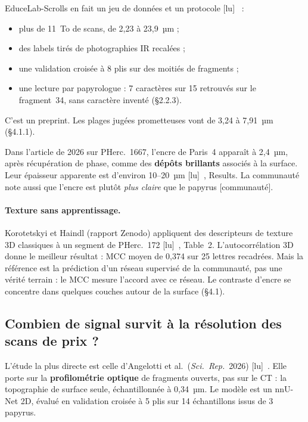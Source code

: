 \documentclass[11pt,a4paper]{article}
\newcommand{\lu}{\textsf{\small[lu]}}
\newcommand{\commu}{\textsf{\small[communauté]}}
\newcommand{\pherc}[1]{PHerc.~#1}
\begin{document}
EduceLab-Scrolls en fait un jeu de données et un protocole \lu~\cite{parsons2023} :
\begin{itemize}
  \item plus de 11~To de scans, de 2,23 à 23,9~µm ;
  \item des labels tirés de photographies IR recalées ;
  \item une validation croisée à 8 plis sur des moitiés de fragments ;
  \item une lecture par papyrologue : 7 caractères sur 15 retrouvés sur le fragment~34,
  sans caractère inventé (§2.2.3).
\end{itemize}
C'est un preprint. Les plages jugées prometteuses vont de 3,24 à 7,91~µm (§4.1.1).

Dans l'article de 2026 sur \pherc{1667}, l'encre de Paris~4 apparaît à 2,4~µm, après
récupération de phase, comme des \textbf{dépôts brillants} associés à la surface. Leur
épaisseur apparente est d'environ 10–20~µm \lu~\cite{angelotti2026complete}, Results.
La communauté note aussi que l'encre est plutôt \emph{plus claire} que le papyrus \commu.

\paragraph{Texture sans apprentissage.} Korotetskyi et Haindl (rapport Zenodo) appliquent
des descripteurs de texture 3D classiques à un segment de \pherc{172}
\lu~\cite{korotetskyi2026}, Table~2. L'autocorrélation 3D donne le meilleur résultat :
MCC moyen de 0,374 sur 25 lettres recadrées. Mais la référence est la prédiction d'un réseau
supervisé de la communauté, pas une vérité terrain : le MCC mesure l'accord avec ce réseau.
Le contraste d'encre se concentre dans quelques couches autour de la surface (§4.1).

\subsection{Combien de signal survit à la résolution des scans de prix ?}

L'étude la plus directe est celle d'Angelotti et al.\ (\emph{Sci.~Rep.}~2026)
\lu~\cite{angelotti2026topo}. Elle porte sur la \textbf{profilométrie optique} de fragments
ouverts, pas sur le CT : la topographie de surface seule, échantillonnée à 0,34~µm. Le modèle
est un nnU-Net 2D, évalué en validation croisée à 5 plis sur 14 échantillons issus de 3 papyrus.
\end{document}
